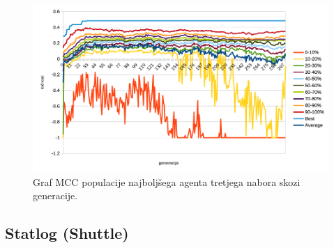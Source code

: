 \begin{figure}[H]
    \begin{center}
        \includegraphics[width=13cm]{car/3/mcc}
    \end{center}
    \caption{Graf MCC populacije najboljšega agenta tretjega nabora skozi generacije.}
    \label{fig:car_mcc_3}
\end{figure}



\subsection{Statlog (Shuttle)}\label{subsec:statlog_test}






\printbibliography[heading=bibintoc,title={Celotna literatura}]